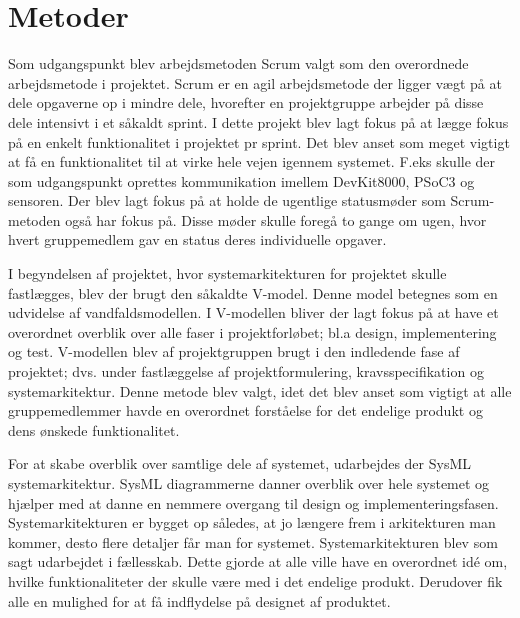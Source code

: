 \section{Metoder}

Som udgangspunkt blev arbejdsmetoden Scrum valgt som den overordnede arbejdsmetode i projektet. 
Scrum er en agil arbejdsmetode der ligger vægt på at dele opgaverne op i mindre dele, hvorefter en projektgruppe arbejder på disse dele intensivt i et såkaldt sprint.
I dette projekt blev lagt fokus på at lægge fokus på en enkelt funktionalitet i projektet pr sprint. Det blev anset som meget vigtigt at få en funktionalitet til at virke hele vejen igennem systemet. F.eks skulle der som udgangspunkt oprettes kommunikation imellem DevKit8000, PSoC3 og sensoren. 
Der blev lagt fokus på at holde de ugentlige statusmøder som Scrum-metoden også har fokus på. Disse møder skulle foregå to gange om ugen, hvor hvert gruppemedlem gav en status deres individuelle opgaver.

I begyndelsen af projektet, hvor systemarkitekturen for projektet skulle fastlægges, blev der brugt den såkaldte V-model.
Denne model betegnes som en udvidelse af vandfaldsmodellen. I V-modellen bliver der lagt fokus på at have et overordnet overblik over alle faser i projektforløbet; bl.a design, implementering og test.
V-modellen blev af projektgruppen brugt i den indledende fase af projektet; dvs. under fastlæggelse af projektformulering, kravsspecifikation og systemarkitektur.
Denne metode blev valgt, idet det blev anset som vigtigt at alle gruppemedlemmer havde en overordnet forståelse for det endelige produkt og dens ønskede funktionalitet. 

For at skabe overblik over samtlige dele af systemet, udarbejdes der SysML systemarkitektur. 
SysML diagrammerne danner overblik over hele systemet og hjælper med at danne en nemmere overgang til design og implementeringsfasen. 
Systemarkitekturen er bygget op således, at jo længere frem i arkitekturen man kommer, desto flere detaljer får man for systemet. 
Systemarkitekturen blev som sagt udarbejdet i fællesskab. Dette gjorde at alle ville have en overordnet idé om, hvilke funktionaliteter der skulle være med i det endelige produkt. Derudover fik alle en mulighed for at få indflydelse på designet af produktet. 

